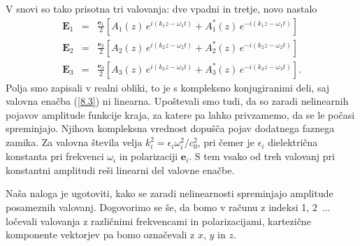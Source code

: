 V snovi so tako prisotna tri valovanja:
dve vpadni in tretje, novo nastalo
\begin{eqnarray}
\mathbf{E}_{1} & = & \frac{\mathbf{e}_{1}}{2}\left[A_{1}(z)\, 
e^{i(k_{1}z-\omega_{1}t)}+A_{1}^{*}(z)\, e^{-i(k_{1}z-\omega_{1}t)}\right]\nonumber \\
\mathbf{E}_{2} & = & \frac{\mathbf{e}_{2}}{2}\left[A_{2}(z)\, 
e^{i(k_{2}z-\omega_{2}t)}+A_{2}^{*}(z)\, e^{-i(k_{2}z-\omega_{2}t)}\right]\nonumber \\
\mathbf{E}_{3} & = & \frac{\mathbf{e}_{3}}{2}\left[A_{3}(z)\, 
e^{i(k_{3}z-\omega_{3}t)}+A_{3}^{*}(z)\, e^{-i(k_{3}z-\omega_{3}t)}\right].
\end{eqnarray}
Polja smo zapisali v realni obliki, to je s kompleksno konjugiranimi
deli, saj valovna enačba (\ref{8.3}) ni linearna. Upoštevali smo tudi,
da so zaradi nelinearnih pojavov amplitude funkcije kraja, za
katere pa lahko privzamemo, da se le počasi spreminjajo. Njihova kompleksna vrednost
dopušča pojav dodatnega faznega zamika. Za valovna
števila velja $k_{i}^{2}=\epsilon_{i}\omega_i^{2}/c_0^{2}$,
pri čemer je $\epsilon_{i}$ dielektrična konstanta pri frekvenci
$\omega_{i}$ in polarizaciji $\mathbf{e}_{i}$. S tem vsako od treh valovanj
pri konstantni amplitudi reši linearni del valovne enačbe. 

Naša naloga
je ugotoviti, kako se zaradi nelinearnosti spreminjajo amplitude posameznih valovanj.
Dogovorimo se še, da bomo v računu z indeksi 1, 2~... ločevali
valovanja z različnimi frekvencami in polarizacijami, kartezične komponente
vektorjev pa bomo označevali z $x$, $y$ in $z$. 

